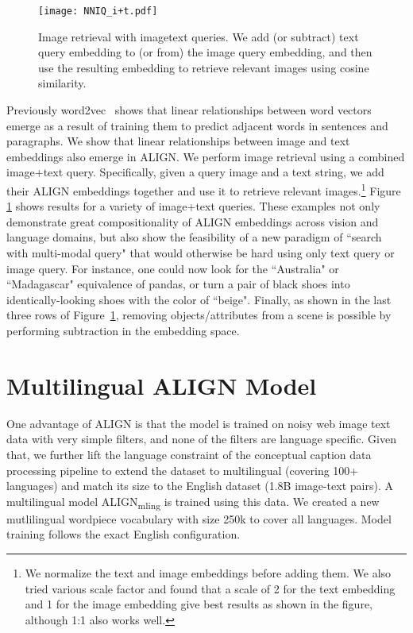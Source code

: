 \documentclass{article}
\begin{document}
\begin{figure}[h!]
\begin{center}
    \centerline{\texttt{[image: NNIQ\_i+t.pdf]}}
    \vskip -0.1in
\caption{Image retrieval with imagetext queries. We add (or subtract) text query embedding
to (or from) the image query embedding, and then use the resulting embedding to retrieve relevant images using cosine similarity.}
    \label{fig:nniq_i+t}
\end{center}
\vspace{-10mm}
\end{figure}


Previously word2vec~\cite{mikolov2013efficient, mikolov2013distributed} shows that linear relationships between word vectors emerge as a result of training them to predict adjacent words in sentences and paragraphs. We show that linear relationships between image and text embeddings also emerge in ALIGN. We perform image retrieval using a combined image+text query. Specifically, given a query image and a text string, we add their ALIGN embeddings together and use it to retrieve relevant images.\footnote{We normalize the text and image embeddings before adding them. We also tried various scale factor and found that a scale of 2 for the text embedding and 1 for the image embedding give best results as shown in the figure, although 1:1 also works well.} Figure \ref{fig:nniq_i+t} shows results for a variety of image+text queries. These examples not only demonstrate great compositionality of ALIGN embeddings across vision and language domains, but also show the feasibility of a new paradigm of ``search with multi-modal query" that would otherwise be hard using only text query or image query. For instance, one could now look for the ``Australia" or ``Madagascar" equivalence of pandas, or turn a pair of black shoes into identically-looking shoes with the color of ``beige". Finally, as shown in the last three rows of Figure~\ref{fig:nniq_i+t}, removing objects/attributes from a scene is possible by performing subtraction in the embedding space.

\section{Multilingual ALIGN Model}

One advantage of ALIGN is that the model is trained on noisy web image text data with very simple filters, and none of the filters are language specific.
Given that, we further lift the language constraint of the conceptual caption data processing pipeline to extend the dataset to multilingual (covering 100+ languages) and match its size to the English dataset (1.8B image-text pairs).
A multilingual model ALIGN\textsubscript{mling} is trained using this data.
We created a new mutlilingual wordpiece vocabulary with size 250k to cover all languages. Model training follows the exact English configuration.
\end{document}
